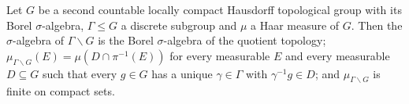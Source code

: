 Let $G$ be a second countable locally compact Hausdorff topological group with its Borel $\sigma$-algebra, $\Gamma\le G$ a discrete subgroup and $\mu$ a Haar measure of $G$. Then the $\sigma$-algebra of $\Gamma\backslash G$ is the Borel $\sigma$-algebra of the quotient topology; $\mu_{\Gamma\backslash G}(E)=\mu(D\cap\pi^{-1}(E))$ for every measurable $E$ and every measurable $D\subseteq G$ such that every $g\in G$ has a unique $\gamma\in\Gamma$ with $\gamma^{-1}g\in D$; and $\mu_{\Gamma\backslash G}$ is finite on compact sets.
